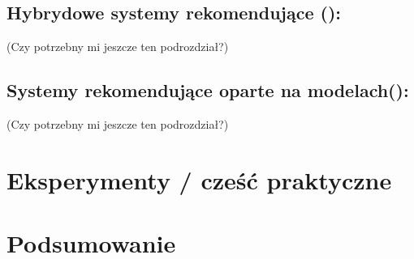\documentclass[12pt,a4paper]{report}
\begin{document}
\section{Hybrydowe systemy rekomendujące ():}
(Czy potrzebny mi jeszcze ten podrozdział?)

\section{Systemy rekomendujące oparte na modelach():}
(Czy potrzebny mi jeszcze ten podrozdział?)



\chapter{Eksperymenty / cześć praktyczne}

\chapter{Podsumowanie}



\nocite{*} %


\end{document}
